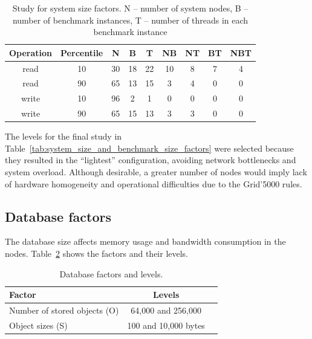 \documentclass[man,floatsintext,12pt]{apa6}
\begin{document}
\begin{table}[h!]
  \caption{Study for system size factors. N -- number of system nodes, B --
number of benchmark instances, T -- number of threads in each benchmark
instance}
  \label{tab:estudo_para_fatores_de_tamanho_do_sistema}
  \begin{tabular}{ccccccccc}         \toprule
  Operation & Percentile & N & B & T & NB & NT & BT & NBT\\ \midrule

  read & 10 & 30 & 18 & 22 & 10 & 8 & 7 & 4 \\

  read & 90 & 65 & 13 & 15 & 3 & 4 & 0 & 0 \\

  write & 10 & 96 & 2 & 1 & 0 & 0 & 0 & 0 \\

  write & 90 & 65 & 15 & 13 & 3 & 3 & 0 & 0 \\ \bottomrule
  \end{tabular}
\end{table}

The levels for the final study in
Table~\ref{tab:system_size_and_benchmark_size_factors} were selected because
they resulted in the ``lightest'' configuration, avoiding network bottlenecks
and system overload.  Although desirable, a greater number of nodes would imply
lack of hardware homogeneity and operational difficulties due to the Grid'5000
rules.
\subsection{Database factors}

The database size affects memory usage and bandwidth consumption in the nodes.
Table~\ref{tab:database_factors_and_levels} shows the factors and their levels.

\begin{table}[h!]
\caption{Database factors and levels.}
\label{tab:database_factors_and_levels}
\begin{tabular}{lcc} \toprule

Factor & Levels \\ \midrule

Number of stored objects (O) & 64,000 and 256,000\\

Object sizes (S) & 100 and 10,000 bytes \\ \bottomrule

\end{tabular}  
\end{table}
\end{document}
